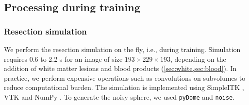 \subsection{Processing during training}

\subsubsection{Resection simulation}

We perform the resection simulation on the fly, i.e., during training.
Simulation requires 0.6 to 2.2 s for an image of size $193 \times 229 \times 193$, depending on the addition of white matter lesions and blood products (\cref{sec:white,sec:blood}).
In practice, we perform expensive operations such as convolutions on subvolumes to reduce computational burden.
The simulation is implemented using SimpleITK \cite{lowekamp_design_2013}, VTK \cite{schroeder_visualization_2006} and NumPy \cite{van_der_walt_numpy_2011}.
To generate the noisy sphere, we used \texttt{pyDome} and \texttt{noise}.


